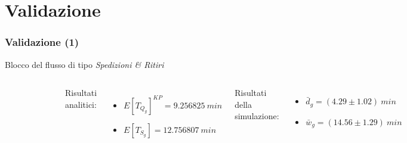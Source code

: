 \documentclass[
	usepdftitle=false,
	xcolor={table, dvipsnames},
	hyperref={
		pdftitle={Studio delle prestazioni di un Ufficio Postale ispirato a Poste Italiane},
    	pdfauthor={A. Chillotti, C. Cuffaro e S. Tiberi}
    }
]{beamer}
\newcommand{\sr}{\textsl{Spedizioni \& Ritiri}}
\begin{document}
\section{Validazione}
\begin{frame}
\frametitle{Validazione (1)}
Blocco del flusso di tipo \sr{}
\vspace{2em}
\begin{columns}[c]
\begin{figure}[ht]
\centering
\includegraphics[width=\textwidth]{validazione-modello-analitico-1a}
\end{figure}
Risultati analitici:
\begin{itemize}
\item $E[T_{Q_g}]^{KP} = 9.256825\ min$
\item $E[T_{S_g}] = 12.756807\ min$
\end{itemize}
Risultati della simulazione:
\begin{itemize}
\item $\bar{d}_g = (4.29 \pm 1.02)\ min$
\item $\bar{w}_g = (14.56 \pm 1.29)\ min$
\end{itemize}
\end{columns}
\end{frame}
\end{document}
